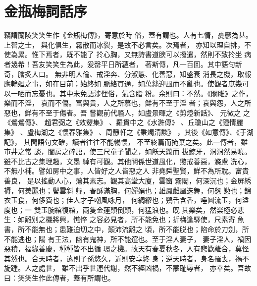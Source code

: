 %

\chapter*{金瓶梅詞話序}

\begin{showcontents}{}


竊謂蘭陵笑笑生作《金瓶梅傳》，寄意於時
俗，蓋有謂也。人有七情，憂鬱為甚。上智之士，
與化俱生，霧散而冰裂，是故不必言矣。次焉者，
亦知以理自排，不使為累。惟下焉者，既不能了
扵心胸，又無詩書道腴可以撥遣，然則不致扵坐
病者幾希！吾友笑笑生為此，爰罄平日所蘊者，
著斯傳，凡一百囬。其中語句新奇，膾炙人口。
無非明人倫、戒淫奔、分淑慝、化善惡，知盛衰
消長之機，取報應輪廻之事，如在目前；始終如
脈絡貫通，如萬絲迎風而不亂也。使觀者庶幾可
以一哂而忘憂也。其中未免語涉俚俗，氣含脂
粉。余則曰：不然。《關雎》之作，樂而不淫，
哀而不傷。富與貴，人之所慕也，鮮有不至于淫
者；哀與怨，人之所惡也，鮮有不至于傷者。吾
嘗觀前代騷人，如盧景暉之《剪燈新話》、
元微之
之《鶯鶯傳》、
趙君弼之《效顰集》
、羅貫中之《水滸傳》
、丘瓊山之《鍾情麗集》
、盧梅湖之《懷春雅集》
、周靜軒之《秉燭清談》
，其後《如意傳》、《于湖記》，
其間語句文確，讀者往往不能暢懷，
不至終篇而掩棄之矣。此一傳者，雖市井之常
談，閨房之碎語，使三尺童子聞之，如飫天漿而
拔鯨牙，洞洞然易曉。雖不比古之集理趣，文墨
綽有可觀。其他關係世道風化，懲戒善惡，滌慮
洗心，不無小補。譬如房中之事，人皆好之人皆惡之人
非堯舜聖賢，鮮不為所耽。富貴善良，
是以搖動人心，蕩其素志。觀其高堂大廈，雲窗
霧閣，何深沉也；金屏綉褥，何羙麗也；鬢雲斜
軃，春酥滿胸，何嬋娟也；雄鳳雌凰迭舞，何慇
懃也；錦衣玉食，何侈費也；佳人才子嘲風咏月，
何綢繆也；鷄舌含香，唾圓流玉，何溢度也；一
雙玉腕綰復綰，兩隻金蓮顛倒顛，何猛浪也。旣
其樂矣，然楽極必悲生：如離别之機將興，憔悴
之容必見者，所不能免也；折梅逢驛使，尺素寄
魚書，所不能無也；患難迫切之中，顛沛流離之
頃，所不能脱也；陷命於刀劍，所不能逃也；陽
有王法，幽有鬼神，所不能逭也。至于淫人妻子，
妻子淫人，禍因惡積，福緣善慶，種種皆不出循
環之機。故天有春夏秋冬，人有悲歡離合，莫怪
其然也。合天時者，逺則子孫悠久，近則安享終
身；逆天時者，身名罹喪，禍不旋踵。人之處世，
雖不出乎世運代謝，然不經凶禍，不蒙耻辱者，
亦幸矣。吾故曰：笑笑生作此傳者，蓋有所謂也。


\end{showcontents}
